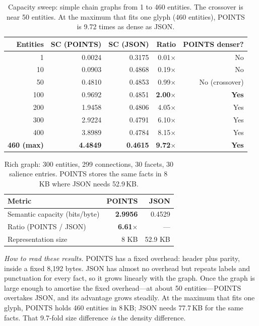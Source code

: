 \begin{table}[ht]
\centering
\caption{Capacity sweep: simple chain graphs from 1 to 460 entities. The crossover is near 50 entities. At the maximum that fits one glyph (460 entities), POINTS is 9.72 times as dense as JSON.}
\label{tab:capacity_sweep}
\begin{tabular}{rrrrr}
\toprule
Entities & SC (POINTS) & SC (JSON) & Ratio & POINTS denser? \\
\midrule
1 & 0.0024 & 0.3175 & 0.01$\times$ & No \\
10 & 0.0903 & 0.4868 & 0.19$\times$ & No \\
50 & 0.4810 & 0.4853 & 0.99$\times$ & No (crossover) \\
100 & 0.9692 & 0.4851 & \textbf{2.00$\times$} & \textbf{Yes} \\
200 & 1.9458 & 0.4806 & 4.05$\times$ & Yes \\
300 & 2.9224 & 0.4791 & 6.10$\times$ & Yes \\
400 & 3.8989 & 0.4784 & 8.15$\times$ & Yes \\
\textbf{460 (max)} & \textbf{4.4849} & \textbf{0.4615} & \textbf{9.72$\times$} & \textbf{Yes} \\
\bottomrule
\end{tabular}
\end{table}

\begin{table}[ht]
\centering
\caption{Rich graph: 300 entities, 299 connections, 30 facets, 30 salience entries. POINTS stores the same facts in 8\,KB where JSON needs 52.9\,KB.}
\label{tab:rich_graph}
\begin{tabular}{lrr}
\toprule
Metric & POINTS & JSON \\
\midrule
Semantic capacity (bits/byte) & \textbf{2.9956} & 0.4529 \\
Ratio (POINTS / JSON) & \textbf{6.61$\times$} & --- \\
Representation size & 8 KB & 52.9 KB \\
\bottomrule
\end{tabular}
\end{table}

\textit{How to read these results.} POINTS has a fixed overhead: header plus parity, inside a fixed 8,192 bytes. JSON has almost no overhead but repeats labels and punctuation for every fact, so it grows linearly with the graph. Once the graph is large enough to amortise the fixed overhead---at about 50 entities---POINTS overtakes JSON, and its advantage grows steadily. At the maximum that fits one glyph, POINTS holds 460 entities in 8\,KB; JSON needs 77.7\,KB for the same facts. That 9.7-fold size difference \textit{is} the density difference.

